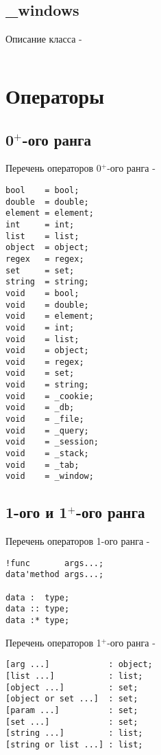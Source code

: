 \documentclass[a4paper, 14pt]{extarticle}
\begin{document}
\subsection{{\color{orange} \_windows}}

Описание класса  -
\begin{lstlisting}[numbers=none]

\end{lstlisting}


\section{Операторы}

\subsection{0$^+$-ого ранга}

\noindent Перечень операторов 0$^+$-ого ранга -
\begin{lstlisting}[numbers=none]
bool    = bool;
double  = double;
element = element;
int     = int;
list    = list;
object  = object;
regex   = regex;
set     = set;
string  = string;
void    = bool;
void    = double;
void    = element;
void    = int;
void    = list;
void    = object;
void    = regex;
void    = set;
void    = string;
void    = _cookie;
void    = _db;
void    = _file;
void    = _query;
void    = _session;
void    = _stack;
void    = _tab;
void    = _window;
\end{lstlisting}

\subsection{1-ого и 1$^+$-ого ранга}

\noindent Перечень операторов 1-ого ранга -
\begin{lstlisting}[numbers=none]
!func       args...;
data'method args...;

data :  type;
data :: type;
data :* type;
\end{lstlisting}

\noindent Перечень операторов 1$^+$-ого ранга -
\begin{lstlisting}[numbers=none]
[arg ...]            : object;
[list ...]           : list;
[object ...]         : set;
[object or set ...]  : set;
[param ...]          : set;
[set ...]            : set;
[string ...]         : list;
[string or list ...] : list;
\end{lstlisting}
\end{document}
